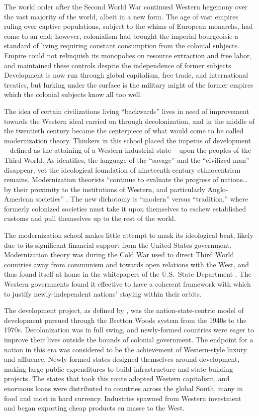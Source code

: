 \documentclass[american]{../../../coursework}
\begin{document}
The world order after the Second World War continued Western hegemony over the
vast majority of the world, albeit in a new form. The age of vast empires
ruling over captive populations, subject to the whims of European monarchs,
had come to an end; however, colonialism had brought the imperial bourgeoisie
a standard of living requiring constant consumption from the colonial
subjects. Empire could not relinquish its monopolies on resource extraction
and free labor, and maintained these controls despite the independence of
former subjects. Development is now run through global capitalism, free trade,
and international treaties, but lurking under the surface is the military
might of the former empires which the colonial subjects know all too well.

The idea of certain civilizations living ``backwards'' lives in need of
improvement towards the Western ideal carried on through decolonization, and
in the middle of the twentieth century became the centerpiece of what would
come to be called modernization theory. Thinkers in this school placed the
impetus of development -- defined as the attaining of a Western industrial
state -- upon the peoples of the Third World. As \textcite{Tipps1973}
identifies, the language of the ``savage'' and the ``civilized man''
disappear, yet the ideological foundation of nineteenth-century ethnocentrism
remains. Modernization theorists ``continue to evaluate the progress of
nations… by their proximity to the institutions of Western, and particularly
Anglo-American societies'' \parencite[206]{Tipps1973}. The new dichotomy is
``modern'' versus ``tradition,'' where formerly colonized societies must take
it upon themselves to eschew established customs and pull themselves up to the
rest of the world.

The modernization school makes little attempt to mask its ideological bent,
likely due to its significant financial support from the United States
government. Modernization theory was during the Cold War used to direct Third
World countries away from communism and towards open relations with the West,
and thus found itself at home in the whitepapers of the U.S.\ State Department
\parencite{So1990}. The Western governments found it effective to have a
coherent framework with which to justify newly-independent nations' staying
within their orbits.

The development project, as defined by \textcite{McMichael2004}, was the
nation-state-centric model of development pursued through the Bretton Woods
system from the 1940s to the 1970s. Decolonization was in full swing, and
newly-formed countries were eager to improve their lives outside the bounds of
colonial government. The endpoint for a nation in this era was considered to
be the achievement of Western-style luxury and affluence. Newly-formed states
designed themselves around development, making large public expenditures to
build infrastructure and state-building projects. The states that took this
route adopted Western capitalism, and enormous loans were distributed to
countries across the global South, many in food and most in hard currency.
Industries spawned from Western investment and began exporting cheap products
en masse to the West.
\end{document}
